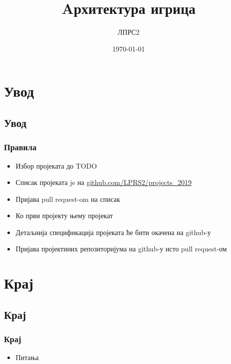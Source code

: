 \documentclass[compress]{beamer}
\title{Aрхитектура игрица}
\author{ЛПРС2}
\institute{РТ-РК}
\date{\today}
\begin{document}


\frame{\titlepage}

\section{Увод}
\subsection{Увод}
\begin{frame}
	\frametitle{\textbf{Правила}}
	
	\begin{itemize}
		\item Избор пројеката до TODO
		\item Списак пројеката je на \url{github.com/LPRS2/projects_2019}
		\item Пријава pull request-om на списак
		\item Ко први пројекту њему пројекат
		\item Детаљнија спецификација пројеката ће бити окачена на github-у
		\item Пријава пројектиних репозиторијума на github-у
			исто pull request-ом
	\end{itemize}
\end{frame}



\section{Крај}
\subsection{Крај}
\begin{frame}
	\frametitle{\textbf{Крај}}
	\begin{itemize}
		\item Питања
	\end{itemize}
\end{frame}

\end{document}
